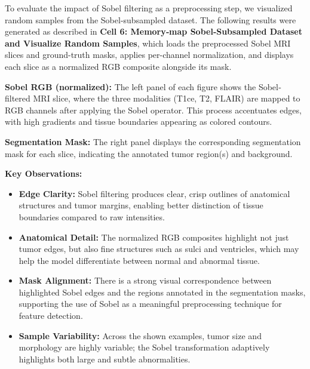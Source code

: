 To evaluate the impact of Sobel filtering as a preprocessing step, we visualized random samples from the Sobel-subsampled dataset. The following results were generated as described in \textbf{Cell 6: Memory‐map Sobel‐Subsampled Dataset and Visualize Random Samples}, which loads the preprocessed Sobel MRI slices and ground-truth masks, applies per-channel normalization, and displays each slice as a normalized RGB composite alongside its mask.

\textbf{Sobel RGB (normalized):}
The left panel of each figure shows the Sobel‐filtered MRI slice, where the three modalities (T1ce, T2, FLAIR) are mapped to RGB channels after applying the Sobel operator. This process accentuates edges, with high gradients and tissue boundaries appearing as colored contours.

\textbf{Segmentation Mask:}
The right panel displays the corresponding segmentation mask for each slice, indicating the annotated tumor region(s) and background.

\textbf{Key Observations:}
\begin{itemize}
    \item \textbf{Edge Clarity:} Sobel filtering produces clear, crisp outlines of anatomical structures and tumor margins, enabling better distinction of tissue boundaries compared to raw intensities.
    \item \textbf{Anatomical Detail:} The normalized RGB composites highlight not just tumor edges, but also fine structures such as sulci and ventricles, which may help the model differentiate between normal and abnormal tissue.
    \item \textbf{Mask Alignment:} There is a strong visual correspondence between highlighted Sobel edges and the regions annotated in the segmentation masks, supporting the use of Sobel as a meaningful preprocessing technique for feature detection.
    \item \textbf{Sample Variability:} Across the shown examples, tumor size and morphology are highly variable; the Sobel transformation adaptively highlights both large and subtle abnormalities.
\end{itemize}

